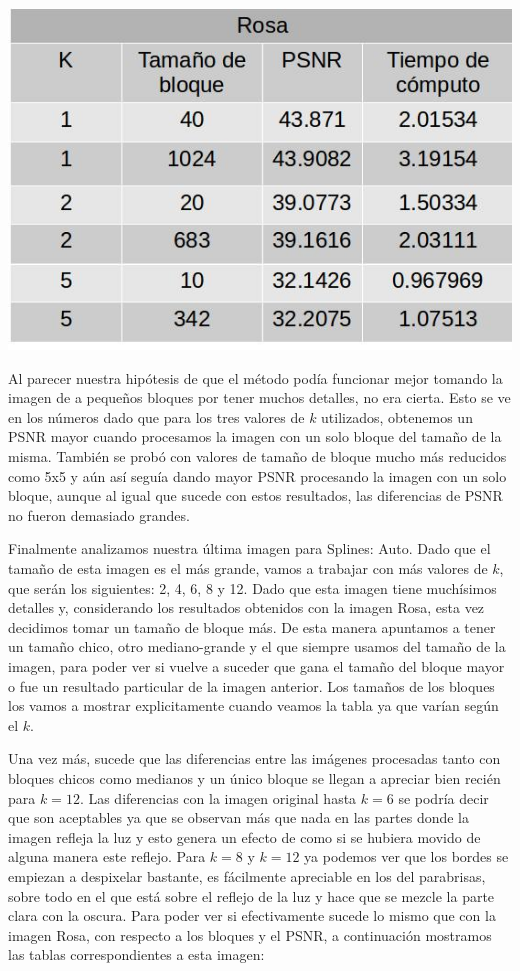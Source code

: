 \documentclass[a4paper]{article}
\begin{document}
\centerline{
\includegraphics[scale=0.5]{imagenes/rosaTabla.jpg}
}

Al parecer nuestra hipótesis de que el método podía funcionar mejor tomando la imagen de a pequeños bloques por tener muchos detalles, no era cierta. Esto se ve en los números dado que para los tres valores de $k$ utilizados, obtenemos un PSNR mayor cuando procesamos la imagen con un solo bloque del tamaño de la misma. También se probó con valores de tamaño de bloque mucho más reducidos como 5x5 y aún así seguía dando mayor PSNR procesando la imagen con un solo bloque, aunque al igual que sucede con estos resultados, las diferencias de PSNR no fueron demasiado grandes.


Finalmente analizamos nuestra última imagen para Splines: Auto. Dado que el tamaño de esta imagen es el más grande, vamos a trabajar con más valores de $k$, que serán los siguientes: 2, 4, 6, 8 y 12. Dado que esta imagen tiene muchísimos detalles y, considerando los resultados obtenidos con la imagen Rosa, esta vez decidimos tomar un tamaño de bloque más. De esta manera apuntamos a tener un tamaño chico, otro mediano-grande y el que siempre usamos del tamaño de la imagen, para poder ver si vuelve a suceder que gana el tamaño del bloque mayor o fue un resultado particular de la imagen anterior.	 Los tamaños de los bloques los vamos a mostrar explicitamente cuando veamos la tabla ya que varían según el $k$.
\par Una vez más, sucede que las diferencias entre las imágenes procesadas tanto con bloques chicos como medianos y un único bloque se llegan a apreciar bien recién para $k = 12$. Las diferencias con la imagen original hasta $k = 6$ se podría decir que son aceptables ya que se observan más que nada en las partes donde la imagen refleja la luz y esto genera un efecto de como si se hubiera movido de alguna manera este reflejo. Para $k = 8$ y $k = 12$ ya podemos ver que los bordes se empiezan a despixelar bastante, es fácilmente apreciable en los del parabrisas, sobre todo en el que está sobre el reflejo de la luz y hace que se mezcle la parte clara con la oscura.
\noindent \newline Para poder ver si efectivamente sucede lo mismo que con la imagen Rosa, con respecto a los bloques y el PSNR, a continuación mostramos las tablas correspondientes a esta imagen:
\newline
\end{document}
